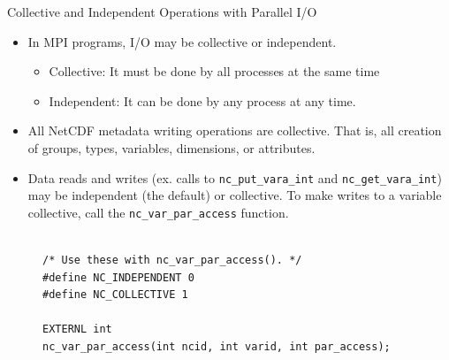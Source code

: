 \documentclass[compress,11pt,xcolor=svgnames,aspectratio=169]{beamer}
\begin{document}
\begin{frame}[fragile]{Collective and Independent Operations with Parallel I/O}

\begin{itemize}
\setlength\itemsep{0.4cm}

  \item In MPI programs, I/O may be collective or independent.

    \begin{itemize}
      \item Collective: It must be done by all processes at the same time
      \item Independent: It can be done by any process at any time.
    \end{itemize}

  \item All NetCDF metadata writing operations are collective. That is, all creation of groups, types, variables, dimensions, or attributes.

  \item Data reads and writes (ex. calls to \verb|nc_put_vara_int| and \verb|nc_get_vara_int|) may be independent (the default) or collective. To make writes to a variable collective, call the \verb|nc_var_par_access| function.

\end{itemize}

\begin{figure}
\centering
\begin{varwidth}{\linewidth}
{ \tiny

\begin{verbatim}

/* Use these with nc_var_par_access(). */
#define NC_INDEPENDENT 0
#define NC_COLLECTIVE 1

EXTERNL int
nc_var_par_access(int ncid, int varid, int par_access);

\end{verbatim}

}
\end{varwidth}
\end{figure}

\end{frame}
\end{document}
